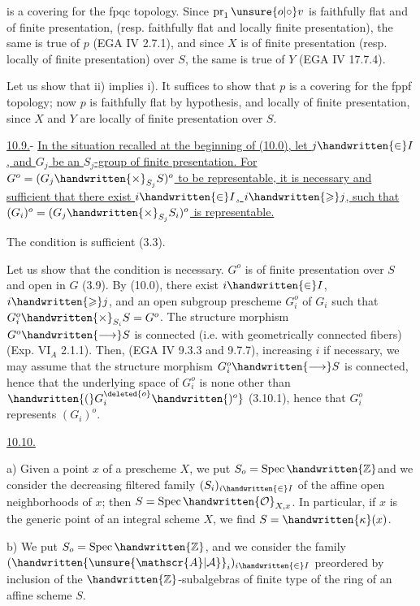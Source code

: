 is a covering for the fpqc topology. Since $\operatorname{pr}_1\mathbin{\unsure{o|\circ}} v$ is faithfully flat and of finite presentation, (resp. faithfully flat and locally  finite presentation), the same is true of $p$ (EGA IV 2.7.1), and since $X$ is of finite presentation (resp. locally of finite presentation) over $S$, the same is true of $Y$ (EGA IV 17.7.4).

Let us show that ii) implies i). It suffices to show that $p$ is a covering for the fppf topology; now $p$ is faithfully flat by hypothesis, and locally of finite presentation, since $X$ and $Y$ are locally of finite presentation over $S$.

\uline{10.9.}- \uline{In the situation recalled at the beginning of (10.0), let $j\handwritten{\in}I$, and $G_j$ be an $S_j$-group of finite presentation. For $G^o=(G_j\handwritten{\times}_{S_j}S)^o$ to be representable, it is necessary and sufficient that there exist  $i\handwritten{\in}I$, $i\handwritten{\geqslant}j$, such that $(G_i)^o=(G_j\handwritten{\times}_{S_j}S_i)^o$ is representable.}

The condition is sufficient (3.3).

Let us show that the condition is necessary.  $G^o$ is of finite presentation over $S$ and open in $G$ (3.9). By (10.0), there exist $i\handwritten{\in}I$, $i\handwritten{\geqslant}j$, and an open subgroup prescheme $G_i^o$ of $G_i$ such that $G_i^o\handwritten{\times}_{S_i}S=G^o$. The structure morphism $G^o\handwritten{\longrightarrow}S$ is connected (i.e. with geometrically connected fibers)(Exp. $\mathrm{VI}_A$ 2.1.1). Then, (EGA IV 9.3.3 and 9.7.7), increasing $i$ if necessary, we may assume that the structure morphism $G_i^o\handwritten{\longrightarrow}S$ is connected, hence that the underlying space of $G_i^o$ is none other than \uline{$\handwritten{(}G_i^{\deleted{o}}\handwritten{)^o}$} (3.10.1), hence that $G_i^o$ represents $(G_i)^o$.

\uline{10.10.} 

a) Given a point $x$ of a prescheme $X$, we put $S_o=\operatorname{Spec}\handwritten{\mathbb{Z}}$\handwritten{/}and we consider the decreasing filtered family $(S_i)_{i\handwritten{\in}I}$ of the  affine open neighborhoods of $x$; then $S=\operatorname{Spec}\handwritten{\mathcal{O}}_{X,x}$. In particular, if $x$ is the generic point of an integral scheme $X$, we find $S=\handwritten{\kappa}(x)$.

b) We put $S_o=\operatorname{Spec}\handwritten{\mathbb{Z}}$, and we consider the family $(\handwritten{\unsure{\mathscr{A}|\mathcal{A}}}_i)_{i\handwritten{\in}I}$ preordered by inclusion of the $\handwritten{\mathbb{Z}}$-subalgebras of finite type of the ring of an affine scheme $S$.
